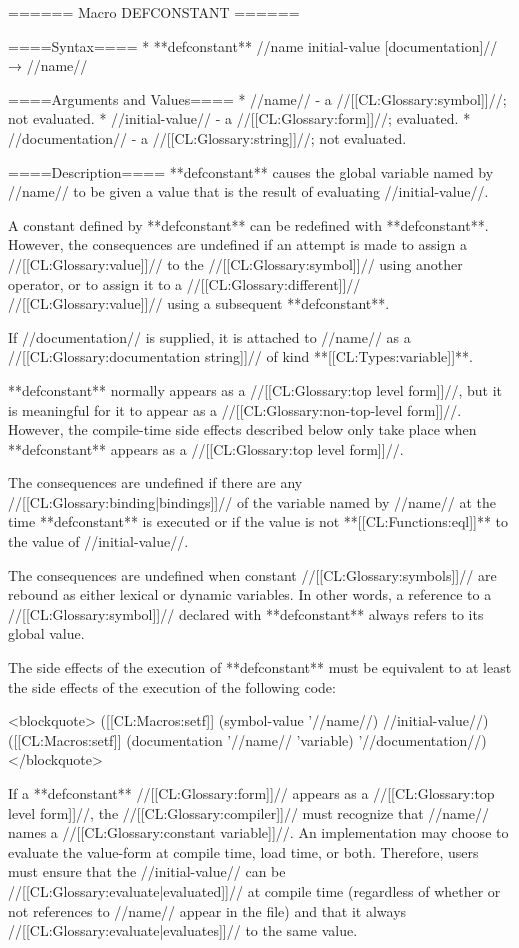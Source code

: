 ====== Macro DEFCONSTANT ======

====Syntax====
  * **defconstant** //name initial-value [documentation]// → //name//

====Arguments and Values====
  * //name// - a //[[CL:Glossary:symbol]]//; not evaluated.
  * //initial-value// - a //[[CL:Glossary:form]]//; evaluated.
  * //documentation// - a //[[CL:Glossary:string]]//; not evaluated.

====Description====
**defconstant** causes the global variable named by //name// to be given a value that is the result of evaluating //initial-value//.

A constant defined by **defconstant** can be redefined with **defconstant**. However, the consequences are undefined if an attempt is made to assign a //[[CL:Glossary:value]]// to the //[[CL:Glossary:symbol]]// using another operator, or to assign it to a //[[CL:Glossary:different]]// //[[CL:Glossary:value]]// using a subsequent **defconstant**.

If //documentation// is supplied, it is attached to //name// as a //[[CL:Glossary:documentation string]]// of kind **[[CL:Types:variable]]**.

**defconstant** normally appears as a //[[CL:Glossary:top level form]]//, but it is meaningful for it to appear as a //[[CL:Glossary:non-top-level form]]//. However, the compile-time side effects described below only take place when **defconstant** appears as a //[[CL:Glossary:top level form]]//.

The consequences are undefined if there are any //[[CL:Glossary:binding|bindings]]// of the variable named by //name// at the time **defconstant** is executed or if the value is not **[[CL:Functions:eql]]** to the value of //initial-value//.

The consequences are undefined when constant //[[CL:Glossary:symbols]]// are rebound as either lexical or dynamic variables. In other words, a reference to a //[[CL:Glossary:symbol]]// declared with **defconstant** always refers to its global value.

The side effects of the execution of **defconstant** must be equivalent to at least the side effects of the execution of the following code:

<blockquote>
([[CL:Macros:setf]] (symbol-value '//name//) //initial-value//)
([[CL:Macros:setf]] (documentation '//name// 'variable) '//documentation//)
</blockquote>

If a **defconstant** //[[CL:Glossary:form]]// appears as a //[[CL:Glossary:top level form]]//, the //[[CL:Glossary:compiler]]// must recognize that //name// names a //[[CL:Glossary:constant variable]]//. An implementation may choose to evaluate the value-form at compile time, load time, or both. Therefore, users must ensure that the //initial-value// can be //[[CL:Glossary:evaluate|evaluated]]// at compile time (regardless of whether or not references to //name// appear in the file) and that it always //[[CL:Glossary:evaluate|evaluates]]// to the same value.

